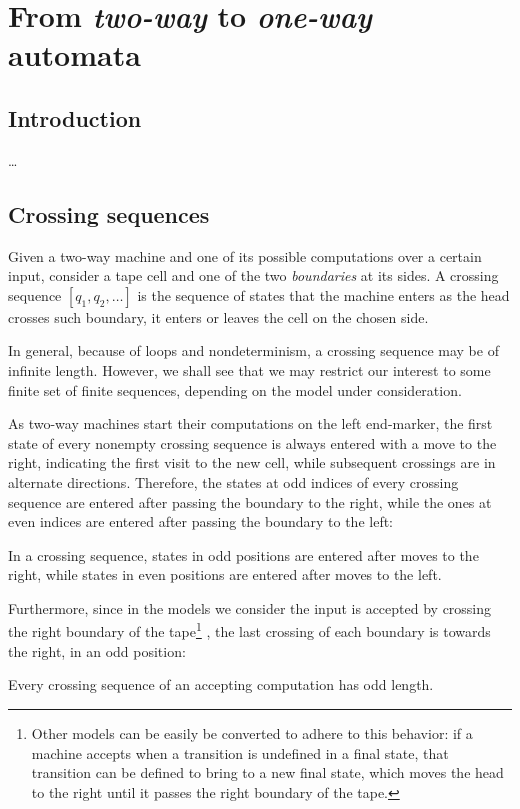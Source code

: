 \chapter{From \emph{two-way} to \emph{one-way} automata}



\section{Introduction}
\dots


\section{Crossing sequences}\label{sec:crossseq2DFA}
Given a two-way machine and one of its possible computations over a certain input, consider a tape cell and one of the two \emph{boundaries} at its sides.
A crossing sequence $[q_1,q_2,\dots]$ is the sequence of states that the machine enters as the head crosses such boundary, \ie it enters or leaves the cell on the chosen side.

In general, because of loops and nondeterminism, a crossing sequence may be of infinite length.
However, we shall see that we may restrict our interest to some finite set of finite sequences, depending on the model under consideration.

As two-way machines start their computations on the left end-marker, the first state of every nonempty crossing sequence is always entered with a move to the right, indicating the first visit to the new cell, while subsequent crossings are in alternate directions.
Therefore, the states at odd indices of every crossing sequence are entered after passing the boundary to the right, while the ones at even indices are entered after passing the boundary to the left:
\begin{fact}\label{fact:crossing-parity}
	In a crossing sequence, states in odd positions are entered after moves to the right, while states in even positions are entered after moves to the left.
\end{fact}

Furthermore, since in the models we consider the input is accepted by crossing the right boundary of the tape\footnote{%
	Other models can be easily be converted to adhere to this behavior: if a machine accepts when a transition is undefined in a final state, that transition can be defined to bring to a new final state, which moves the head to the right until it passes the right boundary of the tape.}%
, the last crossing of each boundary is towards the right, \ie in an odd position:
\begin{fact}\label{fact:crossing-length}
	Every crossing sequence of an accepting computation has odd length.
\end{fact}


